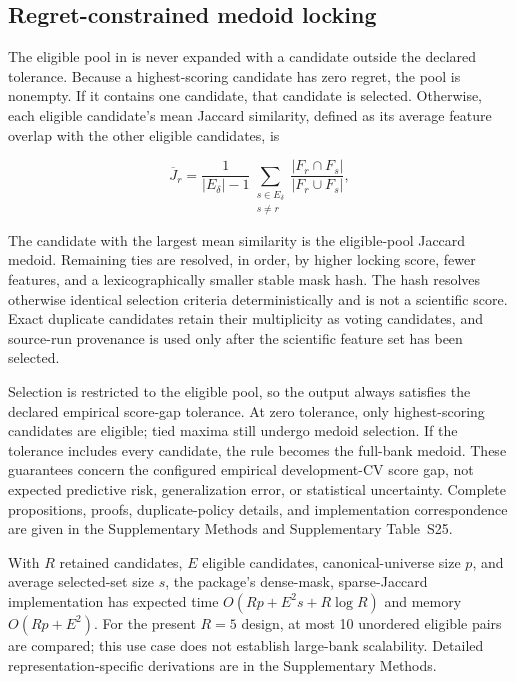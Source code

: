 \subsection{Regret-constrained medoid locking}

The eligible pool in  is never expanded with a candidate outside the declared tolerance. Because a highest-scoring candidate has zero regret, the pool is nonempty. If it contains one candidate, that candidate is selected. Otherwise, each eligible candidate's mean Jaccard similarity, defined as its average feature overlap with the other eligible candidates, is

\begin{equation}
\overline J_r=\frac{1}{|E_\delta|-1}\sum_{\substack{s\in E_\delta\\s\ne r}}
\frac{|F_r\cap F_s|}{|F_r\cup F_s|},
\label{eq:eligible-medoid}
\end{equation}

The candidate with the largest mean similarity is the eligible-pool Jaccard medoid. Remaining ties are resolved, in order, by higher locking score, fewer features, and a lexicographically smaller stable mask hash. The hash resolves otherwise identical selection criteria deterministically and is not a scientific score. Exact duplicate candidates retain their multiplicity as voting candidates, and source-run provenance is used only after the scientific feature set has been selected.

Selection is restricted to the eligible pool, so the output always satisfies the declared empirical score-gap tolerance. At zero tolerance, only highest-scoring candidates are eligible; tied maxima still undergo medoid selection. If the tolerance includes every candidate, the rule becomes the full-bank medoid. These guarantees concern the configured empirical development-CV score gap, not expected predictive risk, generalization error, or statistical uncertainty. Complete propositions, proofs, duplicate-policy details, and implementation correspondence are given in the Supplementary Methods and Supplementary Table~S25.

With \(R\) retained candidates, \(E\) eligible candidates, canonical-universe size \(p\), and average selected-set size \(s\), the package's dense-mask, sparse-Jaccard implementation has expected time \(O(Rp+E^2s+R\log R)\) and memory \(O(Rp+E^2)\). For the present \(R=5\) design, at most 10 unordered eligible pairs are compared; this use case does not establish large-bank scalability. Detailed representation-specific derivations are in the Supplementary Methods.

